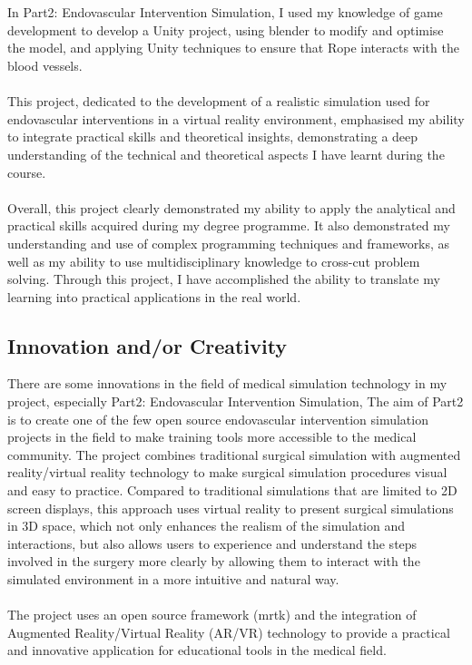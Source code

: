 \documentclass[12pt]{article}
\begin{document}
\\\\
In Part2: Endovascular Intervention Simulation, I used my knowledge of game development to develop a Unity project, using \gls{blender} to modify and optimise the model, and applying Unity techniques to ensure that Rope interacts with the blood vessels.
\\\\
This project, dedicated to the development of a realistic simulation used for endovascular interventions in a virtual reality environment, emphasised my ability to integrate practical skills and theoretical insights, demonstrating a deep understanding of the technical and theoretical aspects I have learnt during the course.
\\\\
Overall, this project clearly demonstrated my ability to apply the analytical and practical skills acquired during my degree programme. It also demonstrated my understanding and use of complex programming techniques and frameworks, as well as my ability to use multidisciplinary knowledge to cross-cut problem solving. Through this project, I have accomplished the ability to translate my learning into practical applications in the real world.



\subsection{Innovation and/or Creativity}
There are some innovations in the field of medical simulation technology in my project, especially Part2: Endovascular Intervention Simulation, The aim of Part2 is to create one of the few open source endovascular intervention simulation projects in the field to make training tools more accessible to the medical community. The project combines traditional surgical simulation with augmented reality/virtual reality technology to make surgical simulation procedures visual and easy to practice. Compared to traditional simulations that are limited to 2D screen displays, this approach uses virtual reality to present surgical simulations in 3D space, which not only enhances the realism of the simulation and interactions, but also allows users to experience and understand the steps involved in the surgery more clearly by allowing them to interact with the simulated environment in a more intuitive and natural way.
\\\\
The project uses an open source framework (\gls{mrtk}) and the integration of Augmented Reality/Virtual Reality (AR/VR) technology to provide a practical and innovative application for educational tools in the medical field. 
\end{document}
